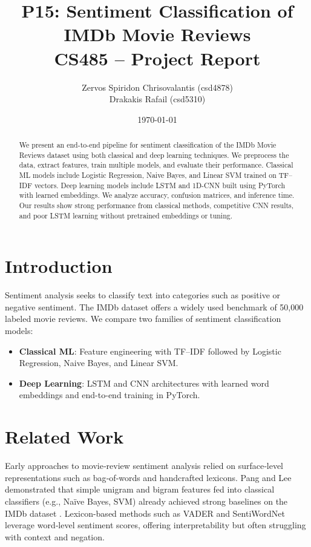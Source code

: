 \documentclass[12pt,a4paper]{article}
\title{%
  \textbf{P15: Sentiment Classification of IMDb Movie Reviews}\\
  \vspace{0.5em}
  \large CS485 -- Project Report
}
\author{%
  Zervos Spiridon Chrisovalantis (csd4878) \\
  Drakakis Rafail (csd5310)
}
\date{\today}
\begin{document}
\maketitle
\thispagestyle{empty}

\begin{abstract}
  We present an end-to-end pipeline for sentiment classification of the IMDb Movie Reviews dataset using both classical and deep learning techniques. We preprocess the data, extract features, train multiple models, and evaluate their performance. Classical ML models include Logistic Regression, Naive Bayes, and Linear SVM trained on TF–IDF vectors. Deep learning models include LSTM and 1D-CNN built using PyTorch with learned embeddings. We analyze accuracy, confusion matrices, and inference time. Our results show strong performance from classical methods, competitive CNN results, and poor LSTM learning without pretrained embeddings or tuning.
\end{abstract}

\newpage
\tableofcontents
\newpage

\section{Introduction}
Sentiment analysis seeks to classify text into categories such as positive or negative sentiment. The IMDb dataset offers a widely used benchmark of 50,000 labeled movie reviews. We compare two families of sentiment classification models:
\begin{itemize}
  \item \textbf{Classical ML}: Feature engineering with TF–IDF followed by Logistic Regression, Naive Bayes, and Linear SVM.
  \item \textbf{Deep Learning}: LSTM and CNN architectures with learned word embeddings and end-to-end training in PyTorch.
\end{itemize}

\section{Related Work}

Early approaches to movie‐review sentiment analysis relied on surface‐level representations such as bag‐of‐words and handcrafted lexicons. Pang and Lee demonstrated that simple unigram and bigram features fed into classical classifiers (e.g., Naïve Bayes, SVM) already achieved strong baselines on the IMDb dataset \cite{Pang2002}. Lexicon-based methods such as VADER and SentiWordNet leverage word‐level sentiment scores, offering interpretability but often struggling with context and negation.
\end{document}
